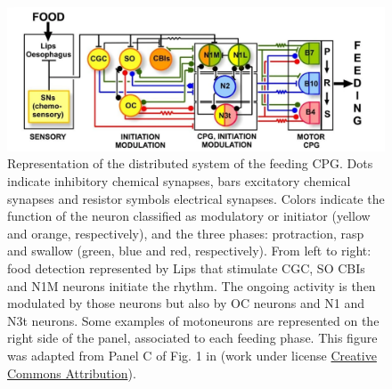\begin{figure}[bth!]
	\centering
	\includegraphics[width=\textwidth]{img/invariants/distributed_benjamin_2012.png}
	\caption{Representation of the distributed system of the feeding CPG. Dots indicate inhibitory chemical synapses, bars excitatory chemical synapses and resistor symbols electrical synapses. Colors indicate the function of the neuron classified as modulatory or initiator (yellow and orange, respectively), and the three phases: protraction, rasp and swallow (green, blue and red, respectively). From left to right: food detection represented by Lips that stimulate CGC, SO CBIs and N1M neurons initiate the rhythm. The ongoing activity is then modulated by those neurons but also by OC neurons and N1 and N3t neurons. Some examples of motoneurons are represented on the right side of the panel, associated to each feeding phase. This figure was adapted from Panel C of Fig. 1 in \textcite{benjamin_distributed_2012} (work under license \href{http://creativecommons.org/licenses/by/2.0}{Creative Commons Attribution}).}
	\label{fig:feeding distribution}%
\end{figure}


